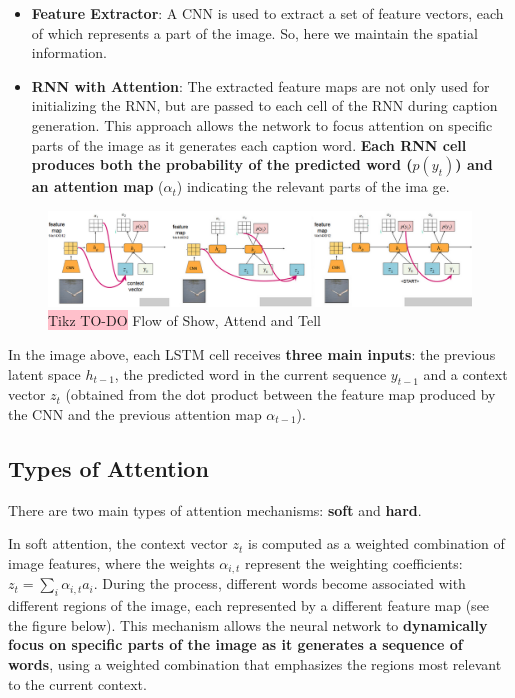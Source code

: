 \begin{itemize}
    \item \textbf{Feature Extractor}: A CNN is used to extract a set of feature vectors, each of which represents a part of the image. So, here we maintain the spatial information.
    \item \textbf{RNN with Attention}: The extracted feature maps are not only used for initializing the RNN, but are passed to each cell of the RNN during caption generation. This approach allows the network to focus attention on specific parts of the image as it generates each caption word. \textbf{Each RNN cell produces both the probability of the predicted word ($p(y_t)$) and an attention map }($\alpha_t$) indicating the relevant parts of the ima ge.
\end{itemize}

\begin{figure}[!htbp]
    \centering
    \includegraphics[width=1\linewidth]{tikz/chapter7 - Attention Model.png}
    \caption{{\color{red}\colorbox{pink}{Tikz TO-DO}}  Flow of Show, Attend and Tell}
\end{figure}

In the image above, each LSTM cell receives \textbf{three main inputs}: the previous latent space $h_{t-1}$, the predicted word in the current sequence $ y_{t-1} $ and a context vector $ z_{t} $ (obtained from the dot product between the feature map produced by the CNN and the previous attention map $\alpha_{t-1}$). 

\subsection{Types of Attention}

There are two main types of attention mechanisms: \textbf{soft} and \textbf{hard}.

In soft attention, the context vector $z_t$ is computed as a weighted combination of image features, where the weights $\alpha_{i,t}$ represent the weighting coefficients: $z_t = \sum_{i}\alpha_{i,t}a_i$.  During the process, different words become associated with different regions of the image, each represented by a different feature map (see the figure below). This mechanism allows the neural network to \textbf{dynamically focus on specific parts of the image as it generates a sequence of words}, using a weighted combination that emphasizes the regions most relevant to the current context.

